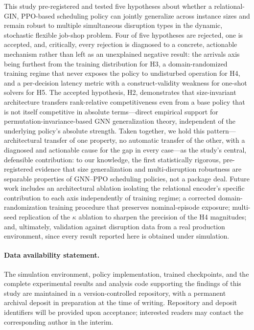 \documentclass[11pt]{article}
\begin{document}
This study pre-registered and tested five hypotheses about whether a relational-GIN, PPO-based scheduling policy can jointly generalize across instance sizes and remain robust to multiple simultaneous disruption types in the dynamic, stochastic flexible job-shop problem. Four of five hypotheses are rejected, one is accepted, and, critically, every rejection is diagnosed to a concrete, actionable mechanism rather than left as an unexplained negative result: the arrivals axis being furthest from the training distribution for H3, a domain-randomized training regime that never exposes the policy to undisturbed operation for H4, and a per-decision latency metric with a construct-validity weakness for one-shot solvers for H5. The accepted hypothesis, H2, demonstrates that size-invariant architecture transfers rank-relative competitiveness even from a base policy that is not itself competitive in absolute terms---direct empirical support for permutation-invariance-based GNN generalization theory, independent of the underlying policy's absolute strength. Taken together, we hold this pattern---architectural transfer of one property, no automatic transfer of the other, with a diagnosed and actionable cause for the gap in every case---as the study's central, defensible contribution: to our knowledge, the first statistically rigorous, pre-registered evidence that size generalization and multi-disruption robustness are separable properties of GNN--PPO scheduling policies, not a package deal. Future work includes an architectural ablation isolating the relational encoder's specific contribution to each axis independently of training regime; a corrected domain-randomization training procedure that preserves nominal-episode exposure; multi-seed replication of the $\kappa$ ablation to sharpen the precision of the H4 magnitudes; and, ultimately, validation against disruption data from a real production environment, since every result reported here is obtained under simulation.

\paragraph{Data availability statement.} The simulation environment, policy implementation, trained checkpoints, and the complete experimental results and analysis code supporting the findings of this study are maintained in a version-controlled repository, with a permanent archival deposit in preparation at the time of writing. Repository and deposit identifiers will be provided upon acceptance; interested readers may contact the corresponding author in the interim.
\end{document}
